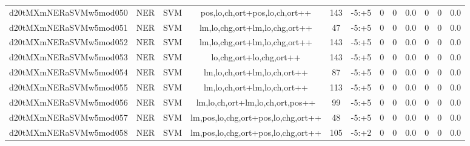 \documentclass[a4paper]{article}
\begin{document}
\begin{landscape}
\begin{center}
\begin{tabular}{ |c|c|c|c|c|c|c|c|c|c|c|c|}
 
 	
 	\small{ d20tMXmNERaSVMw5mod050 } & \small{ NER} & \small{  SVM }  & pos,lo,ch,ort+pos,lo,ch,ort++  &  143 &  \small{  -5:+5 }  &  0 & 0 & 0.0  &  0 & 0 & 0.0 \\
 	

 
 	
 	\small{ d20tMXmNERaSVMw5mod051 } & \small{ NER} & \small{  SVM }  & lm,lo,chg,ort+lm,lo,chg,ort++  &  47 &  \small{  -5:+5 }  &  0 & 0 & 0.0  &  0 & 0 & 0.0 \\
 	

 
 	
 	\small{ d20tMXmNERaSVMw5mod052 } & \small{ NER} & \small{  SVM }  & lm,lo,chg,ort+lm,lo,chg,ort++  &  143 &  \small{  -5:+5 }  &  0 & 0 & 0.0  &  0 & 0 & 0.0 \\
 	

 
 	
 	\small{ d20tMXmNERaSVMw5mod053 } & \small{ NER} & \small{  SVM }  & lo,chg,ort+lo,chg,ort++  &  143 &  \small{  -5:+5 }  &  0 & 0 & 0.0  &  0 & 0 & 0.0 \\
 	

 
 	
 	\small{ d20tMXmNERaSVMw5mod054 } & \small{ NER} & \small{  SVM }  & lm,lo,ch,ort+lm,lo,ch,ort++  &  87 &  \small{  -5:+5 }  &  0 & 0 & 0.0  &  0 & 0 & 0.0 \\
 	

 
 	
 	\small{ d20tMXmNERaSVMw5mod055 } & \small{ NER} & \small{  SVM }  & lm,lo,ch,ort+lm,lo,ch,ort++  &  113 &  \small{  -5:+5 }  &  0 & 0 & 0.0  &  0 & 0 & 0.0 \\
 	

 
 	
 	\small{ d20tMXmNERaSVMw5mod056 } & \small{ NER} & \small{  SVM }  & lm,lo,ch,ort+lm,lo,ch,ort,pos++  &  99 &  \small{  -5:+5 }  &  0 & 0 & 0.0  &  0 & 0 & 0.0 \\
 	

 
 	
 	\small{ d20tMXmNERaSVMw5mod057 } & \small{ NER} & \small{  SVM }  & lm,pos,lo,chg,ort+pos,lo,chg,ort++  &  48 &  \small{  -5:+5 }  &  0 & 0 & 0.0  &  0 & 0 & 0.0 \\
 	

 
 	
 	\small{ d20tMXmNERaSVMw5mod058 } & \small{ NER} & \small{  SVM }  & lm,pos,lo,chg,ort+pos,lo,chg,ort++  &  105 &  \small{  -5:+2 }  &  0 & 0 & 0.0  &  0 & 0 & 0.0 \\
 	


\end{tabular}
\end{center}
\end{landscape}
\end{document}

